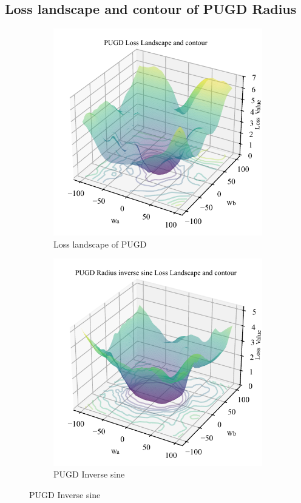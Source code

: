 \documentclass[10pt,twocolumn,letterpaper]{article}
\begin{document}
\subsection{Loss landscape and contour of PUGD Radius}
\label{appendix:radius_llc_cifar10}
\begin{figure}[htbp]
  \centering 
  \begin{subfigure}[t]{\columnwidth}
    \includegraphics[width=\linewidth, height=0.7\linewidth]{images/PUGD_LLC10.pdf}  
    \caption{Loss landscape of PUGD}
    \label{fig:pugd}
  \end{subfigure}
  \vspace{0.2cm}
  
  \begin{subfigure}[t]{\columnwidth}
    \includegraphics[width=\linewidth, height=0.7\linewidth]{images/PUGDRISIN_LLC10.pdf} 
    \caption{PUGD Inverse sine} 
    \label{fig:psin}
  \end{subfigure}
  \vspace{0.2cm}
  

\end{figure}
\end{document}
